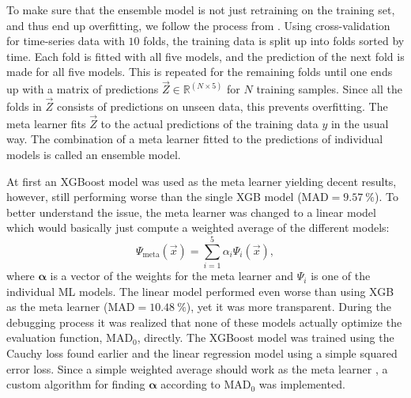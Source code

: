 To make sure that the ensemble model is not just retraining on the training set, and thus end up overfitting, we follow the process from \citet{polleySuperLearnerPrediction2010}. Using cross-validation for time-series data with $10$ folds, the training data is split up into folds sorted by time. Each fold is fitted with all five models, and the prediction of the next fold is made for all five models. This is repeated for the remaining folds until one ends up with a matrix of predictions $\vec{Z} \in \mathbb{R}^{(N \times 5)}$ for $N$ training samples. Since all the folds in $\vec{Z}$ consists of predictions on unseen data, this prevents overfitting. The meta learner fits $\vec{Z}$ to the actual predictions of the training data $y$ in the usual way. The combination of a meta learner fitted to the predictions of individual models is called an ensemble model.

At first an XGBoost model was used as the meta learner yielding decent results, however, still performing worse than the single XGB model ($\mathrm{MAD} = \SI{9.57}{\percent}$). To better understand the issue, the meta learner was changed to a linear model which would basically just compute a weighted average of the different models:
\begin{equation}
  \label{eq:h:meta_learner}
  \Psi_\mathrm{meta}(\vec{x}) = \sum_{i=1}^5 \alpha_i \Psi_i(\vec{x}),
\end{equation}
where $\bm{\alpha}$ is a vector of the weights for the meta learner and $\Psi_i$ is one of the individual ML models. The linear model performed even worse than using XGB as the meta learner ($\mathrm{MAD} = \SI{10.48}{\percent}$), yet it was more transparent. During the debugging process it was realized that none of these models actually optimize the evaluation function, $\mathrm{MAD}_0$, directly. The XGBoost model was trained using the Cauchy loss found earlier and the linear regression model using a simple squared error loss. Since a simple weighted average should work as the meta learner \citep{polleySuperLearnerPrediction2010}, a custom algorithm for finding $\bm{\alpha}$ according to $\mathrm{MAD}_0$ was implemented.

